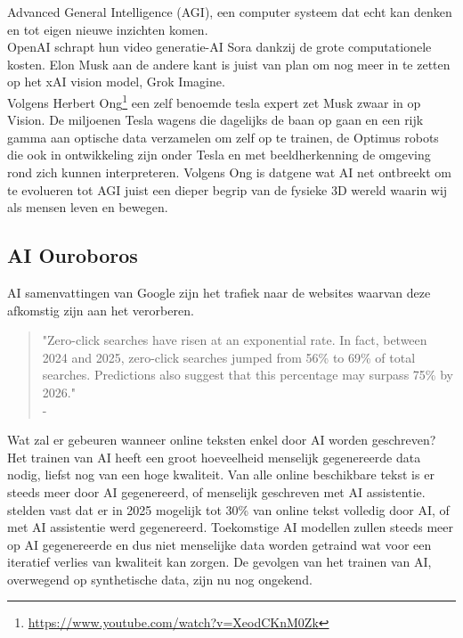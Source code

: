 Advanced General Intelligence (AGI), een computer systeem dat echt kan denken en tot eigen nieuwe inzichten komen. \\

OpenAI schrapt hun video generatie-AI Sora dankzij de grote computationele kosten. Elon Musk aan de andere kant is juist van plan om nog meer in te zetten op het xAI vision model, Grok Imagine. \\

Volgens Herbert Ong\footnote{\href{https://www.youtube.com/watch?v=XeodCKnM0Zk}{https://www.youtube.com/watch?v=XeodCKnM0Zk}} een zelf benoemde tesla expert zet Musk zwaar in op Vision. De miljoenen Tesla wagens die dagelijks de baan op gaan en een rijk gamma aan optische data verzamelen om zelf op te trainen, de Optimus robots die ook in ontwikkeling zijn onder Tesla en met beeldherkenning de omgeving rond zich kunnen interpreteren. Volgens Ong is datgene wat AI net ontbreekt om te evolueren tot AGI juist een dieper begrip van de fysieke 3D wereld waarin wij als mensen leven en bewegen.

\subsection{AI Ouroboros}
AI samenvattingen van Google zijn het trafiek naar de websites waarvan deze afkomstig zijn aan het verorberen. \\

\begin{quote}
    "Zero-click searches have risen at an exponential rate. In fact, between 2024 and 2025, zero-click searches jumped from 56\% to 69\% of total searches. Predictions also suggest that this percentage may surpass 75\% by 2026." \\
    - \autocite{Naveed2026}
\end{quote}

Wat zal er gebeuren wanneer online teksten enkel door AI worden geschreven? Het trainen van AI heeft een groot hoeveelheid menselijk gegenereerde data nodig, liefst nog van een hoge kwaliteit. Van alle online beschikbare tekst is er steeds meer door AI gegenereerd, of menselijk geschreven met AI assistentie. \textcite{Dolezal2026} stelden vast dat er in 2025 mogelijk tot 30\% van online tekst volledig door AI, of met AI assistentie werd gegenereerd. Toekomstige AI modellen zullen steeds meer op AI gegenereerde en dus niet menselijke data worden getraind wat voor een iteratief verlies van kwaliteit kan zorgen. De gevolgen van het trainen van AI, overwegend op synthetische data, zijn nu nog ongekend. \\

